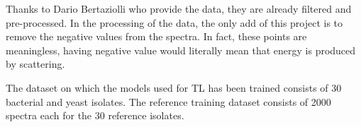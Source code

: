 Thanks to Dario Bertaziolli who provide the data, they are already filtered and pre-processed. In the processing of the data, the only add of this project is to remove the negative values from the spectra. In fact, these points are meaningless, having negative value would literally mean that energy is produced by scattering.

The dataset on which the models used for TL has been trained consists of 30 bacterial and yeast isolates. The reference training dataset consists of 2000 spectra each for the 30 reference isolates. 


